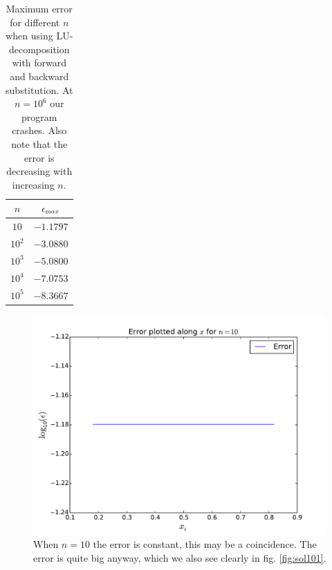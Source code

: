 \documentclass[english, 11pt]{article}
\begin{document}
\begin{table}[H]
  \centering
  \begin{tabular}{ c c }
    \toprule
    $n$ & $\epsilon_{\text max}$ \\
    \midrule
	$10$ &	$-1.1797$ \\
	$10^2$ & $-3.0880$ \\
	$10^3$ & $-5.0800$ \\
	$10^4$ & $-7.0753$ \\
	$10^5$ & $-8.3667$ \\
    \bottomrule
  \end{tabular}
  \caption{Maximum error for different $n$ when using LU-decomposition with forward and backward substitution. At $n=10^6$ our program crashes. Also note that the error is decreasing with increasing $n$.}
  \label{tab:error_max}
\end{table}

\begin{figure}[H]
    \centering
    \includegraphics[width = .9\textwidth]{error_n_10.pdf}
    \caption{When $n=10$ the error is constant, this may be a coincidence. The error is quite big anyway, which we also see clearly in fig. \ref{fig:sol101}.}
    \label{fig:en101}
\end{figure}
\end{document}
